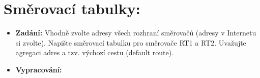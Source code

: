 \documentclass[10pt, a4paper]{article}%
\begin{document}
	\section*{\large{\textbf{Směrovací tabulky:}}}
	\begin{itemize}[label={}]

		\item \textbf{Zadání:}
		Vhodně zvolte adresy všech rozhraní směrovačů (adresy v Internetu si zvolte). Napište směrovací
		tabulku pro směrovače RT1 a RT2. Uvažujte agregaci adres a tzv. výchozí cestu (default route).
		
		\item \textbf{Vypracování:}\\\\
	\end{itemize}
	
\end{document}
